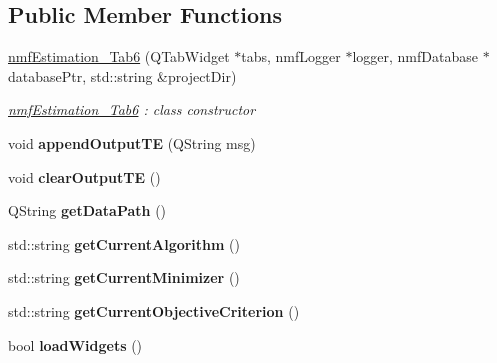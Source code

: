 \subsection*{Public Member Functions}
\begin{DoxyCompactItemize}
\item 
\hyperlink{classnmf_estimation___tab6_a76d9d96d0040005c1beac82e6b1042e7}{nmf\+Estimation\+\_\+\+Tab6} (Q\+Tab\+Widget $\ast$tabs, nmf\+Logger $\ast$logger, nmf\+Database $\ast$database\+Ptr, std\+::string \&project\+Dir)
\begin{DoxyCompactList}\small\item\em \hyperlink{classnmf_estimation___tab6}{nmf\+Estimation\+\_\+\+Tab6} \+: class constructor \end{DoxyCompactList}\item 
void {\bfseries append\+Output\+TE} (Q\+String msg)\hypertarget{classnmf_estimation___tab6_a81688b028744e43740ee3ceb19ffe99a}{}\label{classnmf_estimation___tab6_a81688b028744e43740ee3ceb19ffe99a}

\item 
void {\bfseries clear\+Output\+TE} ()\hypertarget{classnmf_estimation___tab6_aff1da981b2dcc93776be29bba7ec4cb1}{}\label{classnmf_estimation___tab6_aff1da981b2dcc93776be29bba7ec4cb1}

\item 
Q\+String {\bfseries get\+Data\+Path} ()\hypertarget{classnmf_estimation___tab6_acad2efbd876dc189511de13ad8829166}{}\label{classnmf_estimation___tab6_acad2efbd876dc189511de13ad8829166}

\item 
std\+::string {\bfseries get\+Current\+Algorithm} ()\hypertarget{classnmf_estimation___tab6_a81c9d5fa7c08230396d99728f24b23a9}{}\label{classnmf_estimation___tab6_a81c9d5fa7c08230396d99728f24b23a9}

\item 
std\+::string {\bfseries get\+Current\+Minimizer} ()\hypertarget{classnmf_estimation___tab6_aff516e5c4af59ec185d38533d99fcc3b}{}\label{classnmf_estimation___tab6_aff516e5c4af59ec185d38533d99fcc3b}

\item 
std\+::string {\bfseries get\+Current\+Objective\+Criterion} ()\hypertarget{classnmf_estimation___tab6_ac75d359d6f19639d57d49fe09891d920}{}\label{classnmf_estimation___tab6_ac75d359d6f19639d57d49fe09891d920}

\item 
bool {\bfseries load\+Widgets} ()\hypertarget{classnmf_estimation___tab6_aa491ce6e38d28a78bd96ec8d10df4f13}{}\label{classnmf_estimation___tab6_aa491ce6e38d28a78bd96ec8d10df4f13}


\end{DoxyCompactItemize}
